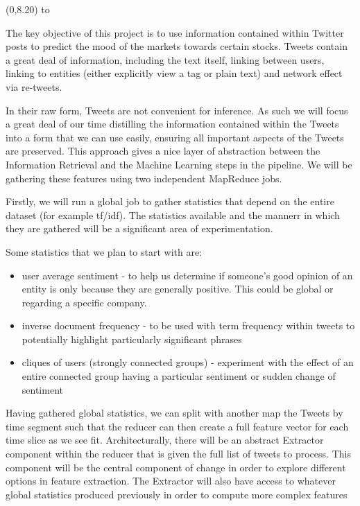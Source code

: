 \documentclass[a0]{a0poster}
\def\Head#1{\noindent\hbox to \hsize{\hfil{\LARGE\color{DarkBlue}\sf #1}}\bigskip}
\def\Subhead#1{\noindent{\large\color{DarkBlue}\sf #1}\bigskip}
\begin{document}
\begin{textblock}{7}(0,8.20)
\Head{Feature Extraction}

\sf
The key objective of this project is to use information contained within Twitter posts to predict the mood of the markets towards certain stocks. 
Tweets contain a great deal of information, including the text itself, linking between users, linking to entities (either explicitly view a tag or plain text) and network effect via re-tweets.

In their raw form, Tweets are not convenient for inference. As such we will focus a great deal of our time distilling the information contained within the Tweets into a form that we can use easily, ensuring all important aspects of the Tweets are preserved.
This approach gives a nice layer of abstraction between the Information Retrieval and the Machine Learning steps in the pipeline. 
We will be gathering these features using two independent MapReduce jobs.


\Subhead{Global Statistics}

\sf
Firstly, we will run a global job to gather statistics that depend on the entire dataset (for example tf/idf).
The statistics available and the mannerr in which they are gathered will be a significant area of experimentation.

Some statistics that we plan to start with are:
\begin{itemize}
\item user average sentiment - to help us determine if someone's good opinion of an entity is only because they are generally positive. This could be global or regarding a specific company.
\item inverse document frequency - to be used with term frequency within tweets to potentially highlight particularly significant phrases
\item cliques of users (strongly connected groups) - experiment with the effect of an entire connected group having a particular sentiment or sudden change of sentiment
\end{itemize}

\Subhead{Extractor}

Having gathered global statistics, we can split with another map the Tweets by time segment such that the reducer can then create a full feature vector for each time slice as we see fit.
Architecturally, there will be an abstract Extractor component within the reducer that is given the full list of tweets to process.
This component will be the central component of change in order to explore different options in feature extraction.
The Extractor will also have access to whatever global statistics produced previously in order to compute more complex features


\end{textblock}
\end{document}
